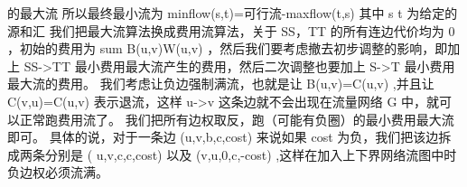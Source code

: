{}\markdownRendererDollarSign{}的最大流\markdownRendererParagraphSeparator
{}所以最终最小流为\markdownRendererDollarSign{} minflow(s,t)=可行流-maxflow(t,s) \markdownRendererDollarSign{}\markdownRendererParagraphSeparator
{}其中\markdownRendererDollarSign{} s \markdownRendererBackslash{} t \markdownRendererDollarSign{}为给定的源和汇\markdownRendererInterblockSeparator
{}
\markdownRendererSectionEnd \markdownRendererSectionBegin
{}\markdownRendererInterblockSeparator
{}我们把最大流算法换成费用流算法，关于\markdownRendererDollarSign{} SS，TT \markdownRendererDollarSign{}的所有连边代价均为\markdownRendererDollarSign{} 0 \markdownRendererDollarSign{}，初始的费用为\markdownRendererDollarSign{} \markdownRendererBackslash{}sum B(u,v)W(u,v) \markdownRendererDollarSign{}，然后我们要考虑撤去初步调整的影响，即加上\markdownRendererDollarSign{} SS->TT\markdownRendererSoftLineBreak
{}\markdownRendererDollarSign{}最小费用最大流产生的费用，然后二次调整也要加上\markdownRendererDollarSign{} S->T \markdownRendererDollarSign{}最小费用最大流的费用。\markdownRendererInterblockSeparator
{}
\markdownRendererSectionEnd \markdownRendererSectionBegin
{}\markdownRendererInterblockSeparator
{}我们考虑让负边强制满流，也就是让\markdownRendererDollarSign{} B(u,v)=C(u,v) \markdownRendererDollarSign{},并且让\markdownRendererDollarSign{} C(v,u)=C(u,v) \markdownRendererDollarSign{}表示退流，这样\markdownRendererDollarSign{} u->v \markdownRendererDollarSign{}这条边就不会出现在流量网络\markdownRendererDollarSign{} G\markdownRendererSoftLineBreak
{}\markdownRendererDollarSign{}中，就可以正常跑费用流了。\markdownRendererInterblockSeparator
{}\markdownRendererInterblockSeparator
{}
\markdownRendererSectionEnd \markdownRendererSectionBegin
{}\markdownRendererInterblockSeparator
{}我们把所有边权取反，跑（可能有负圈）的最小费用最大流即可。\markdownRendererParagraphSeparator
{}具体的说，对于一条边\markdownRendererDollarSign{} (u,v,b,c,cost) \markdownRendererDollarSign{}来说如果\markdownRendererDollarSign{} cost \markdownRendererDollarSign{}为负，我们把该边拆成两条分别是\markdownRendererDollarSign{} (\markdownRendererSoftLineBreak
{}u,v,c,c,cost) \markdownRendererDollarSign{}以及\markdownRendererDollarSign{} (v,u,0,c,-cost) \markdownRendererDollarSign{},这样在加入上下界网络流图中时负边权必须流满。\markdownRendererInterblockSeparator
{}
\markdownRendererSectionEnd 
\markdownRendererSectionEnd \markdownRendererSectionBegin
